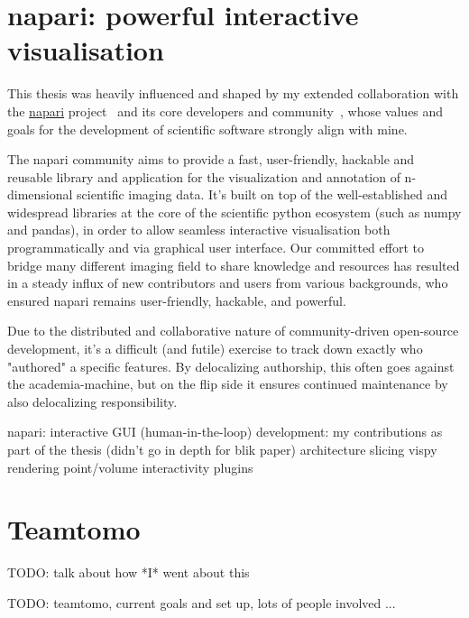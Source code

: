 \section{napari: powerful interactive visualisation}

This thesis was heavily influenced and shaped by my extended collaboration with the \href{https://napari.org/}{napari}
 project~\cite{thenaparicommunityNapariMultidimensionalImage2024} and its core developers and community~\cite{thenaparicommunityCommunityNapari2024}, whose values and goals for the development of scientific software strongly align with mine.

The napari community aims to provide a fast, user-friendly, hackable and reusable library and application for the visualization and annotation of n-dimensional scientific imaging data.
It's built on top of the well-established and widespread libraries at the core of the scientific python ecosystem (such as numpy and pandas), in order to allow seamless interactive visualisation both programmatically and via graphical user interface.
Our committed effort to bridge many different imaging field to share knowledge and resources has resulted in a steady influx of new contributors and users from various backgrounds, who ensured napari remains user-friendly, hackable, and powerful.

Due to the distributed and collaborative nature of community-driven open-source development, it's a difficult (and futile) exercise to track down exactly who "authored" a specific features.
By delocalizing authorship, this often goes against the academia-machine, but on the flip side it ensures continued maintenance by also delocalizing responsibility.


\begin{outline}
\1 napari: interactive GUI (human-in-the-loop)
\1 development: my contributions as part of the thesis (didn't go in depth for blik paper)
    \2 architecture
    \2 slicing
    \2 vispy rendering
    \2 point/volume interactivity
    \2 plugins
\end{outline}

\section{Teamtomo}

TODO: talk about how *I* went about this

TODO: teamtomo, current goals and set up, lots of people involved ...
